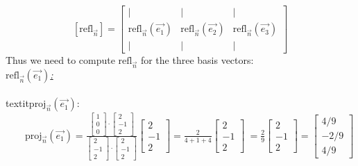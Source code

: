 \documentclass{article}
\begin{document}
$$[\text{refl}_{\vec{n}}]= \begin{bmatrix}
| & | & | \\
\text{refl}_{\vec{n}}(\vec{e_{1}}) & 
\text{refl}_{\vec{n}}(\vec{e_{2}}) & 
\text{refl}_{\vec{n}}(\vec{e_{3}}) \\
| & | & |
\end{bmatrix}$$Thus we need to compute $\text{refl}_{\vec{n}}$ for the three basis vectors:\\
\underline{\textit{$\text{refl}_{\vec{n}}(\vec{e_1})$:}}\\
\\textit{$\text{proj}_{\vec{n}}(\vec{e_1})$:}\\
$\text{
      proj}_{\vec{n}}(\vec{e_1})=\frac
{
\begin{bmatrix}1\\0\\0\end{bmatrix}\cdot\begin{bmatrix}2\\-1\\2\end{bmatrix}
}{
\begin{bmatrix}2\\-1\\2\end{bmatrix}\cdot\begin{bmatrix}2\\-1\\2\end{bmatrix}
}
\begin{bmatrix}2\\-1\\2\end{bmatrix}
=\frac{2}{4+1+4}\begin{bmatrix}2\\-1\\2\end{bmatrix}\
=\frac{2}{9}\begin{bmatrix}2\\-1\\2\end{bmatrix}
=\begin{bmatrix}4/9\\-2/9\\4/9\end{bmatrix}$
\end{document}
